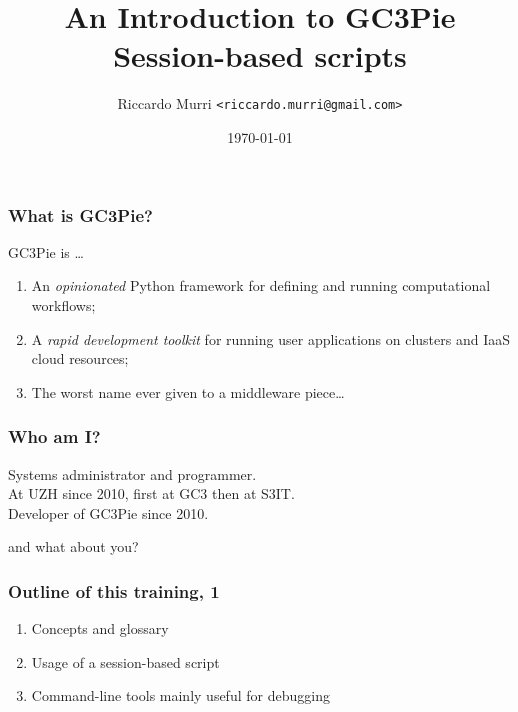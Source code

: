 \documentclass[english,serif,mathserif,usenames,dvipsnames]{beamer}
\begin{document}
\title[GC3Pie Tools]{An Introduction to GC3Pie Session-based scripts}
\author{Riccardo Murri \texttt{<riccardo.murri@gmail.com>}}
\date{\today}

\maketitle

%

\begin{frame}
  \frametitle{What is GC3Pie?}
  GC3Pie is \ldots
  \begin{enumerate}
  \item An \emph{opinionated} Python framework for defining and running computational workflows;
  \item \alert<2>{A \emph{rapid development toolkit} for running user applications on clusters and IaaS cloud resources;}
  \item The worst name ever given to a middleware piece\ldots
  \end{enumerate}

  \+
\end{frame}


\begin{frame}
  \frametitle{Who am I?}
  \begin{center}
    Systems administrator and programmer.
    \\ \+
    At UZH since 2010, first at GC3 then at S3IT.
    \\ \+
    Developer of GC3Pie since 2010.
  \end{center}
\end{frame}


\begin{frame}
  \begin{center}
    {\Huge and what about you?}
  \end{center}
\end{frame}


\begin{frame}
  \frametitle{Outline of this training, 1}
  \begin{enumerate}
  \item Concepts and glossary
  \item Usage of a session-based script
  \item Command-line tools mainly useful for debugging
  \end{enumerate}
\end{frame}
\end{document}
